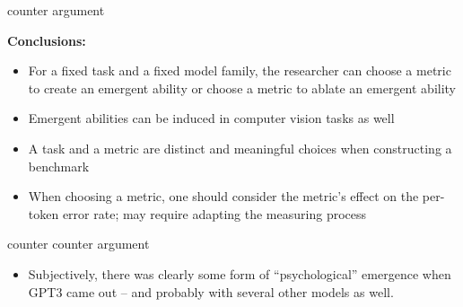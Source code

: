 
\begin{vbframe}{counter argument}

\vfill

\textbf{Conclusions:}
%
\begin{itemize}
%
\item For a fixed task and a fixed model family, the researcher can choose a metric to create an
emergent ability or choose a metric to ablate an emergent ability
%
\item Emergent abilities can be induced in computer vision tasks as well
%
\item A task and a metric are distinct and meaningful choices when constructing a benchmark
%
\item When choosing a metric, one should consider the
metric's effect on the per-token error rate;
may require adapting the measuring process
%
\end{itemize}


\vfill

\end{vbframe}



\begin{vbframe}{counter counter argument}

\vfill

%
\begin{itemize}
%
\item Subjectively, there was clearly some form of ``psychological'' emergence
when GPT3 came out -- and probably with several other models
as well.

%
\end{itemize}


\vfill

\end{vbframe}








\endlecture

